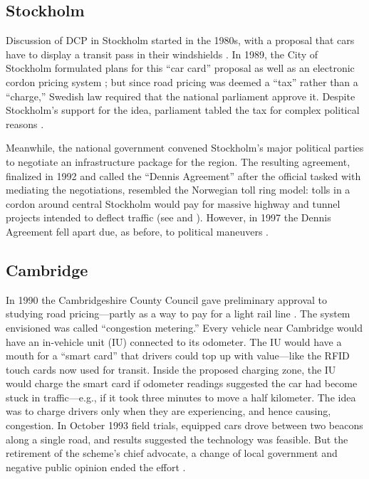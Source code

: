  \subsection{Stockholm}

Discussion of DCP in Stockholm started in the 1980s, with a proposal that cars have to display a transit pass in their windshields \citep{GullbergIsaksson2009,Arnott2005}. In 1989, the City of Stockholm formulated plans for this ``car card'' proposal as well as an electronic cordon pricing system \citep[p. 90]{Hau1992}; but since road pricing was deemed a ``tax'' rather than a ``charge,'' Swedish law required that the national parliament approve it. Despite Stockholm's support for the idea, parliament tabled the tax for complex political reasons \citep{Ahlstrand2001}. 

Meanwhile, the national government convened Stockholm's major political parties to negotiate an infrastructure package for the region. The resulting agreement, finalized in 1992 and called the ``Dennis Agreement'' after the official tasked with mediating the negotiations, resembled the Norwegian toll ring model: tolls in a cordon around central Stockholm would pay for massive highway and tunnel projects intended to deflect traffic  (see \citet[pp. 39-40]{Gomez-Ibanez1994} and \citet[p. 92]{Hau1992}). However, in 1997  the Dennis Agreement fell apart due, as before, to political maneuvers \citep{Ahlstrand2001,GullbergIsaksson2009}.

\subsection{Cambridge}

In 1990 the Cambridgeshire County Council gave preliminary approval to studying road pricing---partly as a way to pay for a light rail line \citep{Ison1996}. The system envisioned was called ``congestion metering.'' Every vehicle near Cambridge would have an in-vehicle unit (IU) connected to its odometer. The IU would have a mouth for a ``smart card'' that drivers could top up with value---like the RFID touch cards now used for transit. Inside the proposed charging zone, the IU would charge the smart card if odometer readings suggested the car had become stuck in traffic---e.g., if it took three minutes to move a half kilometer. The idea was to charge drivers only when they are experiencing, and hence causing, congestion. In October 1993 field trials, equipped cars drove between two beacons along a single road, and results suggested the technology was feasible. But the retirement of the scheme's chief advocate, a change of local government and negative public opinion ended the effort .





